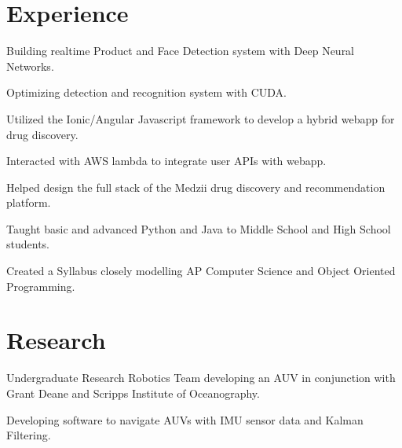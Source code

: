 \documentclass[]{deedy-resume-openfont}
\begin{document}
\begin{minipage}[t]{0.66\textwidth} 


\section{Experience}

\vspace{\topsep} %
\begin{tightemize}
\item Building realtime Product and Face Detection system with Deep Neural Networks.
\item Optimizing detection and recognition system with CUDA.
\end{tightemize}
\sectionsep

\begin{tightemize}
\item Utilized the Ionic/Angular Javascript framework to develop a hybrid webapp for drug discovery.
\item Interacted with AWS lambda to integrate user APIs with webapp.
\item Helped design the full stack of the Medzii drug discovery and recommendation platform.
\end{tightemize}
\sectionsep

\begin{tightemize}
\item Taught basic and advanced Python and Java to Middle School and High School students.
\item Created a Syllabus closely modelling AP Computer Science and Object Oriented Programming.
\end{tightemize}
\sectionsep


\section{Research}
\begin{tightemize}
\item Undergraduate Research Robotics Team developing an AUV in conjunction with Grant Deane and Scripps Institute of Oceanography.
\item Developing software to navigate AUVs with IMU sensor data and Kalman Filtering.
\end{tightemize}
\sectionsep


\end{minipage}
\end{document}
